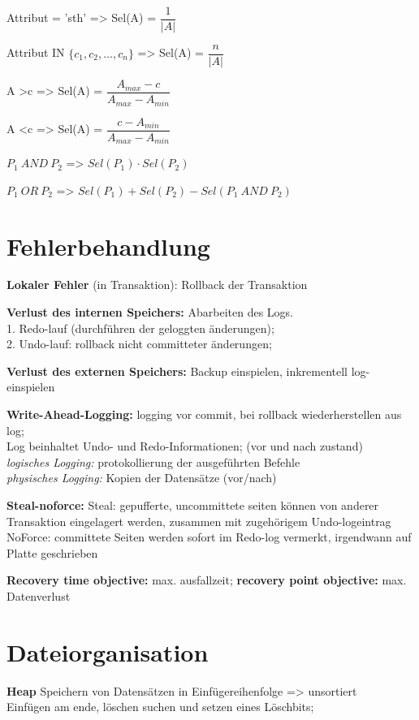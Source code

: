 Attribut = 'sth' => Sel(A) = $\dfrac{1}{|A|}$

Attribut IN $\{c_1,c_2, \dots , c_n\}$ => Sel(A) = $\dfrac{n} { |A|}$

A >c => Sel(A) = $\dfrac{A_{max} -c }{A_{max} - A_{min}}$

A <c => Sel(A) = $\dfrac{c- A_{min} }{A_{max} - A_{min}}$

$P_1~AND~P_2$ => $Sel(P_1) \cdot Sel(P_2)$

$P_1~OR~P_2$ => $Sel(P_1) + Sel(P_2) - Sel(P_1~AND~P_2)$



\section{Fehlerbehandlung}
\textbf{Lokaler Fehler} (in Transaktion): Rollback der Transaktion

\textbf{Verlust des internen Speichers:} Abarbeiten des Logs.\\
1. Redo-lauf (durchführen der geloggten änderungen); \\
2. Undo-lauf: rollback nicht committeter änderungen;

\textbf{Verlust des externen Speichers:} Backup einspielen, inkrementell log-einspielen


\textbf{Write-Ahead-Logging:} logging vor commit, bei rollback wiederherstellen aus log;\\
Log beinhaltet Undo- und Redo-Informationen; (vor und nach zustand)\\
\textit{logisches Logging:} protokollierung der ausgeführten Befehle\\
\textit{physisches Logging:} Kopien der Datensätze (vor/nach)

\textbf{Steal-noforce:}
Steal: gepufferte, uncommittete seiten können von anderer Transaktion eingelagert werden, zusammen mit zugehörigem Undo-logeintrag\\
NoForce: committete Seiten werden sofort im Redo-log vermerkt, irgendwann auf Platte geschrieben



\textbf{Recovery time objective:} max. ausfallzeit; \textbf{recovery point objective:} max. Datenverlust

\section{Dateiorganisation}
\textbf{Heap} Speichern von Datensätzen in Einfügereihenfolge => unsortiert\\
Einfügen am ende, löschen suchen und setzen eines Löschbits;

